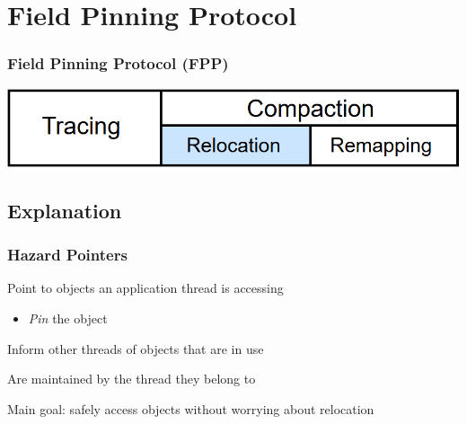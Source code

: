 \documentclass{beamer}
\newcommand{\linespace}{\vskip 0.25cm}
\begin{document}
\section[FPP]{Field Pinning Protocol}

\begin{frame}

\frametitle{Field Pinning Protocol (FPP)}

\begin{center}
\includegraphics[width=.85\textwidth]{Illustrations/gc_cycle_locator_relocation.png}
\end{center}

\end{frame}



\subsection*{Explanation}

\begin{frame}

\frametitle{Hazard Pointers}

Point to objects an application thread is accessing
\begin{itemize}
\item \emph{Pin} the object
\end{itemize}

\linespace
\linespace

Inform other threads of objects that are in use

\linespace
\linespace

Are maintained by the thread they belong to

\linespace
\linespace

Main goal: safely access objects without worrying about relocation



\end{frame}
\end{document}
